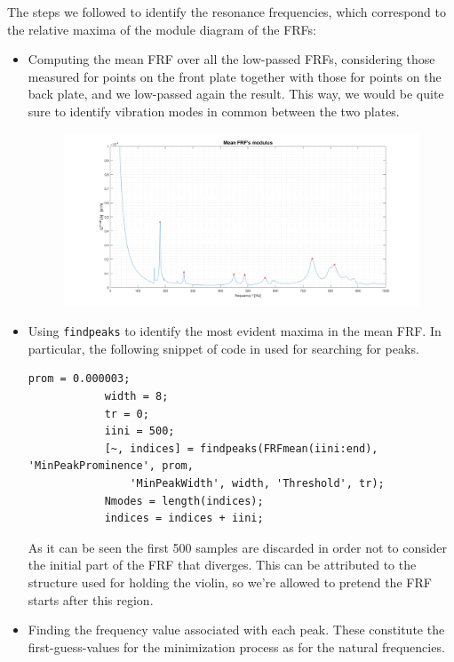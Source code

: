 \documentclass[a4paper,12pt,oneside]{article}
\begin{document}
The steps we followed to identify the resonance frequencies, which correspond to the relative maxima of the module diagram of the FRFs:

\begin{itemize}
	\item Computing the mean FRF over all the low-passed FRFs, considering those measured for points on the front plate together with those for points on the back plate, and we low-passed again the result. This way, we would be quite sure to identify vibration modes in common between the two plates.

		\begin{figure}[H]
			\hspace{-70pt}
			\includegraphics[scale=0.4]{frf_mean}
		\end{figure}

	\item Using \lstinline!findpeaks! to identify the most evident maxima in the mean FRF. In particular, the following snippet of code in used for searching for peaks.

		\begin{lstlisting}[caption = {Peaks' search}]
			prom = 0.000003;
			width = 8;
			tr = 0;
			iini = 500;
			[~, indices] = findpeaks(FRFmean(iini:end), 'MinPeakProminence', prom,
				'MinPeakWidth',	width, 'Threshold', tr);
			Nmodes = length(indices);
			indices = indices + iini;
		\end{lstlisting}

As it can be seen the first 500 samples are discarded in order not to consider the initial part of the FRF that diverges. This can be attributed to the structure used for holding the violin, so we're allowed to pretend the FRF starts after this region.

	\item Finding the frequency value associated with each peak. These constitute the first-guess-values for the minimization process as for the natural frequencies.

\end{itemize}
\end{document}
